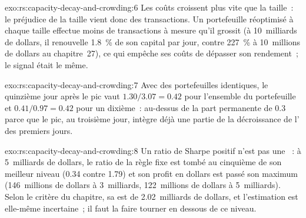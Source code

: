 \begin{solution}{exo:rs:capacity-decay-and-crowding:6}
Les coûts croissent plus vite que la taille~: le préjudice de la taille vient donc des transactions. Un portefeuille réoptimisé à chaque taille effectue moins de transactions à mesure qu'il grossit (à 10~milliards de dollars, il renouvelle 1.8~\% de
son capital par jour, contre 227~\% à 10~millions de dollars au chapitre~27), ce qui empêche ses coûts de dépasser son rendement~; le signal était le même.
\end{solution}

\begin{solution}{exo:rs:capacity-decay-and-crowding:7}
Avec des portefeuilles identiques, le quinzième jour après le pic vaut $1.30/3.07 = 0.42$ pour l'ensemble du portefeuille et $0.41/0.97 = 0.42$ pour un dixième~: au-dessus de la part permanente de 0.3
parce que le pic, au troisième jour, intègre déjà une partie de la décroissance de l' des premiers jours.
\end{solution}

\begin{solution}{exo:rs:capacity-decay-and-crowding:8}
Un ratio de Sharpe positif n'est pas une ~: à 5~milliards de dollars, le ratio de la règle fixe est tombé au cinquième de son meilleur niveau (0.34 contre 1.79) et son profit en dollars est
passé son maximum (146~millions de dollars à 3~milliards, 122~millions de dollars à 5~milliards). Selon le critère du chapitre, sa  est de 2.02~milliards de dollars, et l'estimation est elle-même
incertaine~; il faut la faire tourner en dessous de ce niveau.
\end{solution}

